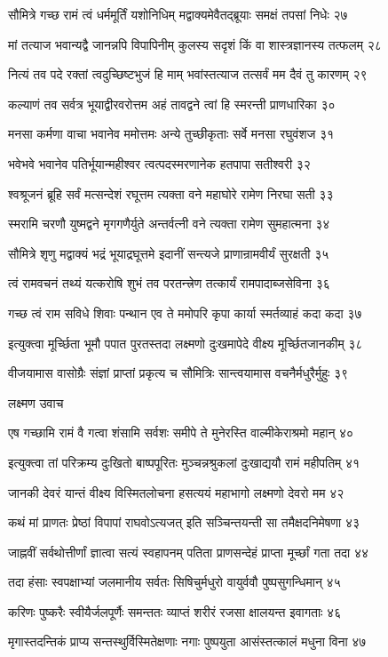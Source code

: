 सौमित्रे गच्छ रामं त्वं धर्ममूर्तिं यशोनिधिम्
मद्वाक्यमेवैतद्ब्रूयाः समक्षं तपसां निधेः २७

मां तत्याज भवान्यद्वै जानन्नपि विपापिनीम्
कुलस्य सदृशं किं वा शास्त्रज्ञानस्य तत्फलम् २८

नित्यं तव पदे रक्तां त्वदुच्छिष्टभुजं हि माम्
भवांस्तत्याज तत्सर्वं मम दैवं तु कारणम् २९

कल्याणं तव सर्वत्र भूयाद्वीरवरोत्तम
अहं तावद्वने त्वां हि स्मरन्ती प्राणधारिका ३०

मनसा कर्मणा वाचा भवानेव ममोत्तमः
अन्ये तुच्छीकृताः सर्वे मनसा रघुवंशज ३१

भवेभवे भवानेव पतिर्भूयान्महीश्वर
त्वत्पदस्मरणानेक हतपापा सतीश्वरी ३२

श्वश्रूजनं ब्रूहि सर्वं मत्सन्देशं रघूत्तम
त्यक्ता वने महाघोरे रामेण निरघा सती ३३

स्मरामि चरणौ युष्मद्वने मृगगणैर्युते
अन्तर्वत्नी वने त्यक्ता रामेण सुमहात्मना ३४

सौमित्रे शृणु मद्वाक्यं भद्रं भूयाद्रघूत्तमे
इदानीं सन्त्यजे प्राणान्रामवीर्यं सुरक्षती ३५

त्वं रामवचनं तथ्यं यत्करोषि शुभं तव
परतन्त्त्रेण तत्कार्यं रामपादाब्जसेविना ३६

गच्छ त्वं राम सविधे शिवाः पन्थान एव ते
ममोपरि कृपा कार्या स्मर्तव्याहं कदा कदा ३७

इत्युक्त्वा मूर्च्छिता भूमौ पपात पुरतस्तदा
लक्ष्मणो दुःखमापेदे वीक्ष्य मूर्च्छितजानकीम् ३८

वीजयामास वासोग्रैः संज्ञां प्राप्तां प्रकृत्य च
सौमित्रिः सान्त्वयामास वचनैर्मधुरैर्मुहुः ३९

लक्ष्मण उवाच

एष गच्छामि रामं वै गत्वा शंसामि सर्वशः
समीपे ते मुनेरस्ति वाल्मीकेराश्रमो महान् ४०

इत्युक्त्वा तां परिक्रम्य दुःखितो बाष्पपूरितः
मुञ्चन्नश्रुकलां दुःखाद्ययौ रामं महीपतिम् ४१

जानकी देवरं यान्तं वीक्ष्य विस्मितलोचना
हसत्ययं महाभागो लक्ष्मणो देवरो मम ४२

कथं मां प्राणतः प्रेष्ठां विपापां राघवोऽत्यजत्
इति सञ्चिन्तयन्ती सा तमैक्षदनिमेषणा ४३

जाह्नवीं सर्वथोत्तीर्णां ज्ञात्वा सत्यं स्वहापनम्
पतिता प्राणसन्देहं प्राप्ता मूर्च्छां गता तदा ४४

तदा हंसाः स्वपक्षाभ्यां जलमानीय सर्वतः
सिषिचुर्मधुरो वायुर्ववौ पुष्पसुगन्धिमान् ४५

करिणः पुष्करैः स्वीयैर्जलपूर्णैः समन्ततः
व्याप्तं शरीरं रजसा क्षालयन्त इवागताः ४६

मृगास्तदन्तिकं प्राप्य सन्तस्थुर्विस्मितेक्षणाः
नगाः पुष्पयुता आसंस्तत्कालं मधुना विना ४७

